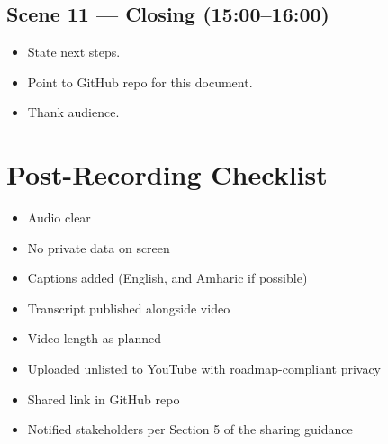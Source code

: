\subsection*{Scene 11 — Closing (15:00--16:00)}
\begin{itemize}
  \item State next steps.
  \item Point to GitHub repo for this document.
  \item Thank audience.
\end{itemize}

\section{Post-Recording Checklist}

\begin{itemize}
  \item[$\square$] Audio clear
  \item[$\square$] No private data on screen
  \item[$\square$] Captions added (English, and Amharic if possible)
  \item[$\square$] Transcript published alongside video
  \item[$\square$] Video length as planned
  \item[$\square$] Uploaded unlisted to YouTube with roadmap-compliant privacy
  \item[$\square$] Shared link in GitHub repo
  \item[$\square$] Notified stakeholders per Section 5 of the sharing guidance
\end{itemize}